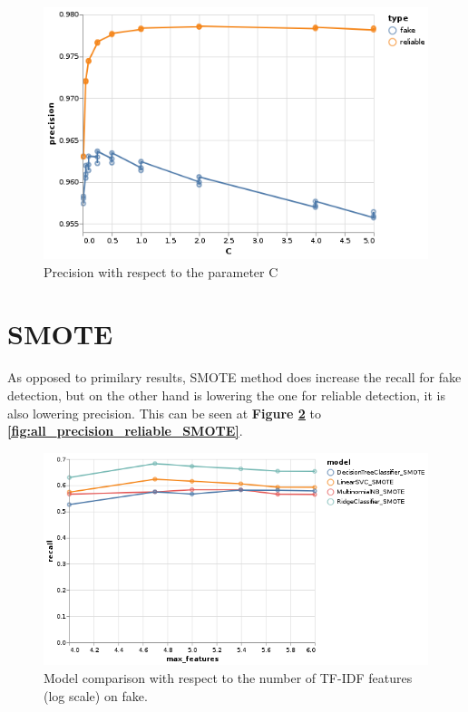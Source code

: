 \documentclass[11pt,a4paper,oneside]{report}
\begin{document}
\begin{figure}[h]
	\centering
	\includegraphics[width=\textwidth]{output/LinearSVC_precision.png}
	\caption{Precision with respect to the parameter C}
	\label{fig:LinearSVC_precision}
\end{figure}

\section{SMOTE}

As opposed to primilary results, SMOTE method does increase the recall for fake detection, but on the other hand is lowering the one for reliable detection, it is also lowering precision. This can be seen at \textbf{Figure \ref{fig:all_recall_fake_SMOTE}} to \textbf{\ref{fig:all_precision_reliable_SMOTE}}.

\begin{figure}[h]
	\centering
	\includegraphics[width=\textwidth]{output/all_fake_recall_SMOTE.png}
	\caption{Model comparison with respect to the number of TF-IDF features (log scale) on fake.}
	\label{fig:all_recall_fake_SMOTE}
\end{figure}
\end{document}
